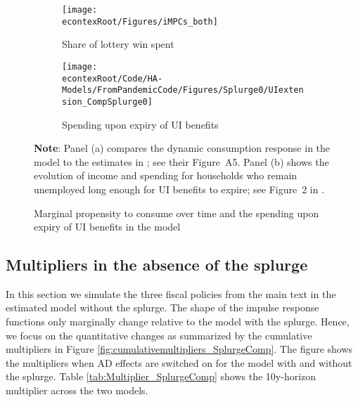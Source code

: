 \documentclass[\econtexRoot/HAFiscal-online-appendix]{subfiles}
\begin{document}
\begin{figure}[thb]
	\centering
	\begin{subfigure}[b]{.48\linewidth}
		\centering
		\texttt{[image: \\econtexRoot/Figures/iMPCs\_both]}
		\caption{Share of lottery win spent}
		\notinsubfile{\label{fig:USaggmpclotterywin_wSplZero}}
	\end{subfigure}
	\begin{subfigure}[b]{.48\linewidth}
		\centering
		\texttt{[image: \\econtexRoot/Code/HA-Models/FromPandemicCode/Figures/Splurge0/UIextension\_CompSplurge0]}
		\caption{Spending upon expiry of UI benefits}
		\notinsubfile{\label{fig:expiryUI_wSplZero}}
	\end{subfigure}%
	\caption{Marginal propensity to consume over time and the spending upon expiry of UI benefits in the model}
	\notinsubfile{\label{fig:untargetedMoments_wSplZero}}
	\parbox{16cm}{\small \vspace{.15cm} \textbf{Note}: Panel (a) compares the dynamic consumption response in the model to the estimates in {\citet{fagereng_mpc_2021}}; see their Figure~A5.
Panel (b) shows the evolution of income and spending for households who remain unemployed long enough for UI benefits to expire; see Figure~2 in {\citet{ganongConsumer2019}}.\normalsize}
\end{figure}




\FloatBarrier
\subsection{Multipliers in the absence of the splurge}

In this section we simulate the three fiscal policies from the main text in the estimated model without the splurge. The shape of the impulse response functions only marginally change relative to the model with the splurge. Hence, we focus on the quantitative changes as summarized by the cumulative multipliers in Figure \ref{fig:cumulativemultipliers_SplurgeComp}.
The figure shows the multipliers when AD effects are switched on for the model with and without the splurge.
Table \ref{tab:Multiplier_SplurgeComp} shows the 10y-horizon multiplier across the two models.
\end{document}
